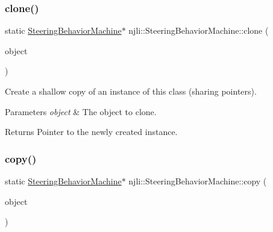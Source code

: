 \mbox{\label{classnjli_1_1_steering_behavior_machine_a2f36fb5b2930a51164b442b399b2e414}} 
\subsubsection{\texorpdfstring{clone()}{clone()}}
{\footnotesize\ttfamily static \mbox{\hyperlink{classnjli_1_1_steering_behavior_machine}{Steering\+Behavior\+Machine}}$\ast$ njli\+::\+Steering\+Behavior\+Machine\+::clone (\begin{DoxyParamCaption}\item[{const \mbox{\hyperlink{classnjli_1_1_steering_behavior_machine}{Steering\+Behavior\+Machine}} \&}]{object }\end{DoxyParamCaption})\hspace{0.3cm}{\ttfamily [static]}}

Create a shallow copy of an instance of this class (sharing pointers).


\begin{DoxyParams}{Parameters}
{\em object} & The object to clone.\\
\hline
\end{DoxyParams}
\begin{DoxyReturn}{Returns}
Pointer to the newly created instance. 
\end{DoxyReturn}
\mbox{\label{classnjli_1_1_steering_behavior_machine_a63326be519b9ee6d77687f90c6304697}} 
\subsubsection{\texorpdfstring{copy()}{copy()}}
{\footnotesize\ttfamily static \mbox{\hyperlink{classnjli_1_1_steering_behavior_machine}{Steering\+Behavior\+Machine}}$\ast$ njli\+::\+Steering\+Behavior\+Machine\+::copy (\begin{DoxyParamCaption}\item[{const \mbox{\hyperlink{classnjli_1_1_steering_behavior_machine}{Steering\+Behavior\+Machine}} \&}]{object }\end{DoxyParamCaption})\hspace{0.3cm}{\ttfamily [static]}}

